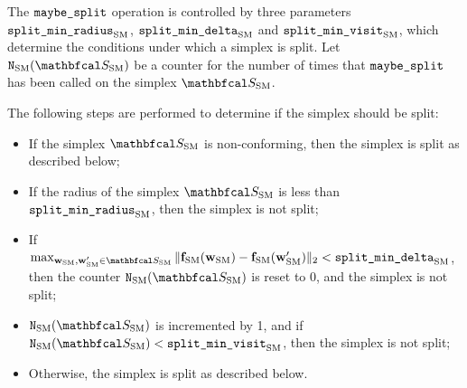        The ${\textnormal{\texttt{maybe\_split}}}$ operation is controlled by three parameters ${\textnormal{\texttt{split\_min\_radius}}_{{\textnormal{SM}}}}$, ${\textnormal{\texttt{split\_min\_delta}}_{{\textnormal{SM}}}}$ and ${\textnormal{\texttt{split\_min\_visit}}_{{\textnormal{SM}}}}$, which determine the conditions under which a simplex is split. Let $\NSM(\SSM)$ be a counter for the number of times that ${\textnormal{\texttt{maybe\_split}}}$ has been called on the simplex $\SSM$. 
        
        The following steps are performed to determine if the simplex should be split:
        \begin{itemize}
            \item 
                If the simplex $\SSM$ is non-conforming, then the simplex is split as described below;
            \item 
                If the radius of the simplex $\SSM$ is less than ${\textnormal{\texttt{split\_min\_radius}}_{{\textnormal{SM}}}}$, then the simplex is not split;
            \item 
                If $\max_{\wSM,\wSMprime\in\SSM}\| \fSM(\wSM) - \fSM(\wSMprime) \|_2 < \splitmindelta$, then the counter $\NSM(\SSM)$ is reset to 0, and the simplex is not split;
            \item 
                $\NSM(\SSM)$ is incremented by 1, and if $\NSM(\SSM) < \splitminvis$, then the simplex is not split;
            \item 
                Otherwise, the simplex is split as described below.
        \end{itemize}

